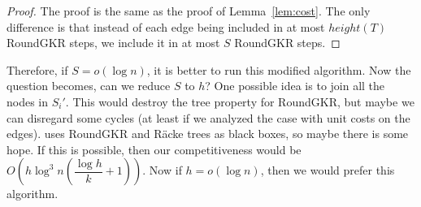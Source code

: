 \documentclass[12pt]{article}
\begin{document}
\begin{proof}
The proof is the same as the proof of Lemma~\ref{lem:cost}. The only difference is that instead of each edge being included in at most $height(T)$ RoundGKR steps, we include it in at most $S$ RoundGKR steps. 
\end{proof}

Therefore, if $S = o(\log n)$, it is better to run this modified algorithm. Now the question becomes, can we reduce $S$ to $h$? One possible idea is to join all the nodes in $S_i'$. This would destroy the tree property for RoundGKR, but maybe we can disregard some cycles (at least if we analyzed the case with unit costs on the edges). \cite{ssc} uses RoundGKR and R\"{a}cke trees as black boxes, so maybe there is some hope. If this is possible, then our competitiveness would be $O(h\log^3n(\dfrac{\log h}{k} + 1))$. Now if $h = o(\log n)$, then we would prefer this algorithm.



\end{document}
